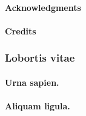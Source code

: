 




\frontmatter

\renewcommand{\hbTitle}{Placeholder Title \protect\\ That is kind of long}
\renewcommand{\hbSubtitle}{Created by Artefact2, typeset with \XeTeX \protect\\ \url{https://github.com/Artefact2/texbrew/}}
\renewcommand*{\hbCoverFile}{assets/samples/cover}
\hbMakecover

\renewcommand*{\hbSubcoverFile}{assets/samples/cover2}
\hbMakesubcover

\paragraph*{Acknowledgments} {\footnotesize \lipsum[100-101]}

\paragraph*{Credits}

{\footnotesize
\begin{itemize}

\end{itemize}}

\clearpage
\tableofcontents*

\mainmatter


 \lipsum[104-105]

\begin{phNote2}
\lipsum[106]
\end{phNote2}

\lipsum[107-108]

\begin{phNote}
\subsubsection*{Lobortis vitae}
\paragraph*{Urna sapien.} \lipsum[2]
\paragraph*{Aliquam ligula.} \lipsum[3]
\end{phNote}

